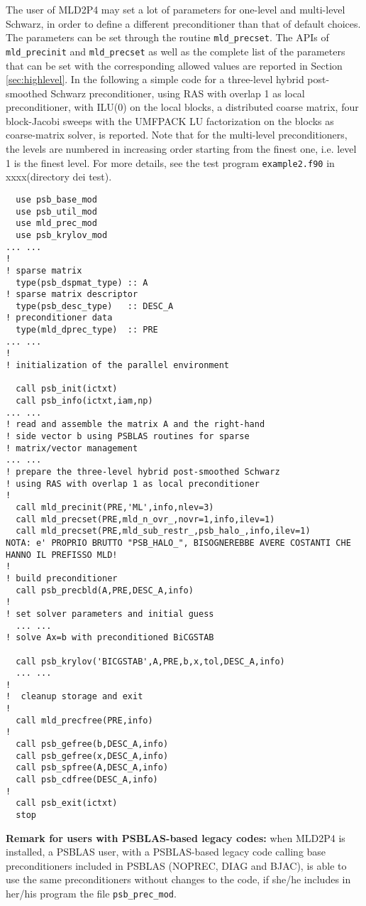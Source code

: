 The user of MLD2P4 may set a lot of parameters for one-level and multi-level Schwarz, in order
to define a different preconditioner than that of default choices. The parameters
can be set through the routine \verb|mld_precset|. The APIs of \verb|mld_precinit| and  \verb|mld_precset| as well as the complete 
list of the parameters that can be set with the corresponding allowed values are reported in Section \ref{sec:highlevel}. In the following a simple code
for a three-level hybrid post-smoothed Schwarz preconditioner, using RAS with overlap 1 as local preconditioner,
with ILU(0) on the local blocks, a distributed coarse matrix, four block-Jacobi sweeps with the UMFPACK LU
factorization on the blocks as coarse-matrix solver, is reported. Note that for the multi-level preconditioners, the levels are numbered in increasing
order starting from the finest one, i.e. level 1 is the finest level. 
For more details, see the test program \verb|example2.f90| in xxxx(directory dei test).\\[0.5cm]

\begin{verbatim}
  use psb_base_mod
  use psb_util_mod 
  use mld_prec_mod
  use psb_krylov_mod
... ...
!
! sparse matrix
  type(psb_dspmat_type) :: A
! sparse matrix descriptor
  type(psb_desc_type)   :: DESC_A
! preconditioner data
  type(mld_dprec_type)  :: PRE
... ...
!
! initialization of the parallel environment

  call psb_init(ictxt)
  call psb_info(ictxt,iam,np)
... ...
! read and assemble the matrix A and the right-hand
! side vector b using PSBLAS routines for sparse
! matrix/vector management
... ...
! prepare the three-level hybrid post-smoothed Schwarz
! using RAS with overlap 1 as local preconditioner
!
  call mld_precinit(PRE,'ML',info,nlev=3)
  call mld_precset(PRE,mld_n_ovr_,novr=1,info,ilev=1)
  call mld_precset(PRE,mld_sub_restr_,psb_halo_,info,ilev=1)
NOTA: e' PROPRIO BRUTTO "PSB_HALO_", BISOGNEREBBE AVERE COSTANTI CHE HANNO IL PREFISSO MLD!
!
! build preconditioner
  call psb_precbld(A,PRE,DESC_A,info)
!
! set solver parameters and initial guess
  ... ...
! solve Ax=b with preconditioned BiCGSTAB

  call psb_krylov('BICGSTAB',A,PRE,b,x,tol,DESC_A,info)
  ... ...
!  
!  cleanup storage and exit
!
  call mld_precfree(PRE,info)
!
  call psb_gefree(b,DESC_A,info)
  call psb_gefree(x,DESC_A,info)
  call psb_spfree(A,DESC_A,info)
  call psb_cdfree(DESC_A,info)
!
  call psb_exit(ictxt)
  stop

\end{verbatim}

{\bf Remark for users with PSBLAS-based legacy codes:} when MLD2P4 is installed, a PSBLAS user, with a PSBLAS-based legacy code 
calling base preconditioners included in PSBLAS (NOPREC, DIAG and BJAC), is able to use the same preconditioners without changes to the code, if she/he
includes in her/his program the file \verb|psb_prec_mod|.

